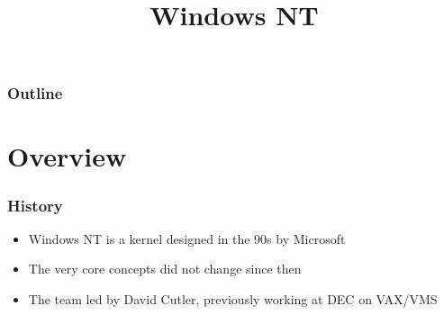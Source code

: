 %
%
%
%
%
%

%
%

%
%

\def\path{../../../..}

%
%



%
%

\title{Windows NT}

%
%



%
%

\begin{frame}
  \titlepage
\end{frame}

%
%

\begin{frame}
  \frametitle{Outline}

  \tableofcontents
\end{frame}

%
%

\section{Overview}


\begin{frame}
  \frametitle{History}

  \begin{itemize}
    \item
      Windows NT is a kernel designed in the 90s by Microsoft
    \item
      The very core concepts did not change since then
    \item
      The team led by David Cutler, previously working at DEC on VAX/VMS
  \end{itemize}

\end{frame}


